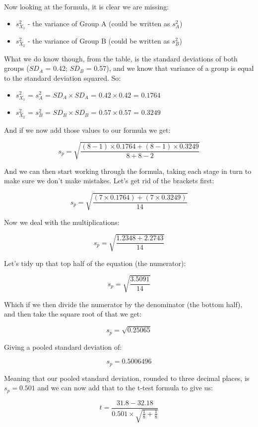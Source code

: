 \documentclass[
  oneside]{book}
\providecommand{\tightlist}{%
  \setlength{\itemsep}{0pt}\setlength{\parskip}{0pt}}
\begin{document}
Now looking at the formula, it is clear we are missing:

\begin{itemize}
\tightlist
\item
  \(s^2_{X_1}\) - the variance of Group A (could be written as \(s^2_{A}\))
\item
  \(s^2_{X_2}\) - the variance of Group B (could be written as \(s^2_{B}\))
\end{itemize}

What we do know though, from the table, is the standard deviations of both groups (\(SD_A\) = 0.42; \(SD_B\) = 0.57), and we know that variance of a group is equal to the standard deviation squared. So:

\begin{itemize}
\tightlist
\item
  \(s^2_{X_1}\) = \(s^2_A\) = \(SD_A \times SD_A\) = \(0.42 \times 0.42\) = \(0.1764\)
\item
  \(s^2_{X_2}\) = \(s^2_B\) = \(SD_B \times SD_B\) = \(0.57 \times 0.57\) = \(0.3249\)
\end{itemize}

And if we now add those values to our formula we get:

\[s_p = \sqrt{\frac{(8 -1)  \times 0.1764 + (8 -1)\times 0.3249}{8 + 8 - 2}}\]

And we can then start working through the formula, taking each stage in turn to make sure we don't make mistakes. Let's get rid of the brackets first:

\[s_p = \sqrt{\frac{(7  \times 0.1764) + (7 \times 0.3249)}{14}}\]

Now we deal with the multiplications:

\[s_p = \sqrt{\frac{1.2348 + 2.2743}{14}}\]

Let's tidy up that top half of the equation (the numerator):

\[s_p = \sqrt{\frac{3.5091}{14}}\]

Which if we then divide the numerator by the denominator (the bottom half), and then take the square root of that we get:

\[s_p = \sqrt{0.25065}\]

Giving a pooled standard deviation of:

\[s_p = 0.5006496\]

Meaning that our pooled standard deviation, rounded to three decimal places, is \(s_p = 0.501\) and we can now add that to the t-test formula to give us:

\[t = \frac{31.8 - 32.18}{0.501 \times \sqrt{\frac{1}{8} + \frac{1}{8}}}\]
\end{document}
